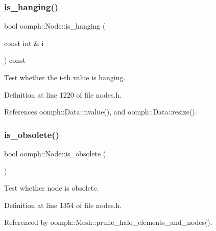 \mbox{\label{classoomph_1_1Node_a55991f57a3f949774da64c6947fef9b2}} 
\subsubsection{\texorpdfstring{is\+\_\+hanging()}{is\_hanging()}\hspace{0.1cm}{\footnotesize\ttfamily [2/2]}}
{\footnotesize\ttfamily bool oomph\+::\+Node\+::is\+\_\+hanging (\begin{DoxyParamCaption}\item[{const int \&}]{i }\end{DoxyParamCaption}) const\hspace{0.3cm}{\ttfamily [inline]}}



Test whether the i-\/th value is hanging. 



Definition at line 1220 of file nodes.\+h.



References oomph\+::\+Data\+::nvalue(), and oomph\+::\+Data\+::resize().

\mbox{\label{classoomph_1_1Node_a2b1ff7b3b709fbf575ff27983483d9a2}} 
\subsubsection{\texorpdfstring{is\+\_\+obsolete()}{is\_obsolete()}}
{\footnotesize\ttfamily bool oomph\+::\+Node\+::is\+\_\+obsolete (\begin{DoxyParamCaption}{ }\end{DoxyParamCaption})\hspace{0.3cm}{\ttfamily [inline]}}



Test whether node is obsolete. 



Definition at line 1354 of file nodes.\+h.



Referenced by oomph\+::\+Mesh\+::prune\+\_\+halo\+\_\+elements\+\_\+and\+\_\+nodes().


